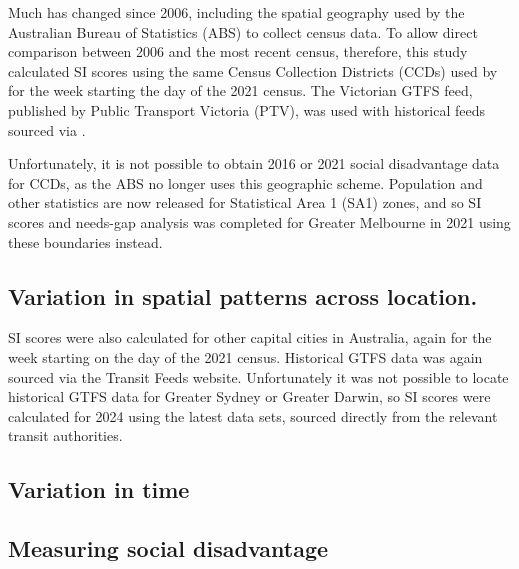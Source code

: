 \documentclass[preprint, 3p,
authoryear]{elsarticle} %
\begin{document}
Much has changed since 2006, including the spatial geography used by the
Australian Bureau of Statistics (ABS) to collect census data. To allow
direct comparison between 2006 and the most recent census, therefore,
this study calculated SI scores using the same Census Collection
Districts (CCDs) used by \citet{currie2010identifying} for the week
starting the day of the 2021 census. The Victorian GTFS feed, published
by Public Transport Victoria (PTV), was used with historical feeds
sourced via \citet{transitfeeds_victoria:2023aa}.

Unfortunately, it is not possible to obtain 2016 or 2021 social
disadvantage data for CCDs, as the ABS no longer uses this geographic
scheme. Population and other statistics are now released for Statistical
Area 1 (SA1) zones, and so SI scores and needs-gap analysis was
completed for Greater Melbourne in 2021 using these boundaries instead.

\hypertarget{variation-in-spatial-patterns-across-location.}{%
\subsection{Variation in spatial patterns across
location.}\label{variation-in-spatial-patterns-across-location.}}

SI scores were also calculated for other capital cities in Australia,
again for the week starting on the day of the 2021 census. Historical
GTFS data was again sourced via the Transit Feeds website. Unfortunately
it was not possible to locate historical GTFS data for Greater Sydney or
Greater Darwin, so SI scores were calculated for 2024 using the latest
data sets, sourced directly from the relevant transit authorities.

\hypertarget{variation-in-time}{%
\subsection{Variation in time}\label{variation-in-time}}

\hypertarget{measuring-social-disadvantage}{%
\subsection{Measuring social
disadvantage}\label{measuring-social-disadvantage}}
\end{document}
